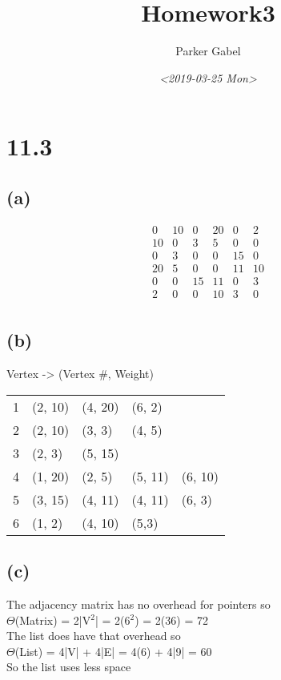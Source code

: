 \documentclass[11pt]{article}
\author{Parker Gabel}
\date{\textit{<2019-03-25 Mon>}}
\title{Homework3}
\begin{document}
\maketitle
\section{11.3}
\label{sec:org24d306e}
\subsection{(a)}
\label{sec:orgce7fce7}
\[
\begin{matrix}
 0 & 10 & 0 & 20 & 0 & 2 \\
 10 & 0 & 3 & 5 & 0 & 0 \\
 0 & 3 & 0 & 0 & 15 & 0 \\
 20 & 5 & 0 & 0 & 11 & 10 \\
 0 & 0 & 15 & 11 & 0 & 3 \\
 2 & 0 & 0 & 10 & 3 & 0 \\
\end{matrix}
\]
\subsection{(b)}
\label{sec:orgc41f13f}
Vertex -> (Vertex \#, Weight)\\
\begin{center}
\begin{tabular}{rllll}
1 & (2, 10) & (4, 20) & (6, 2) & \\
2 & (2, 10) & (3, 3) & (4, 5) & \\
3 & (2, 3) & (5, 15) &  & \\
4 & (1, 20) & (2, 5) & (5, 11) & (6, 10)\\
5 & (3, 15) & (4, 11) & (4, 11) & (6, 3)\\
6 & (1, 2) & (4, 10) & (5,3) & \\
\end{tabular}
\end{center}
\subsection{(c)}
\label{sec:orge02da1f}
The adjacency matrix has no overhead for pointers so\\
\(\Theta\)(Matrix) = 2|V\(^{\text{2}}\)| = 2(6\(^{\text{2}}\)) = 2(36) = 72\\
The list does have that overhead so\\
\(\Theta\)(List) = 4|V| + 4|E| = 4(6) + 4|9| = 60\\
So the list uses less space\\
\end{document}

